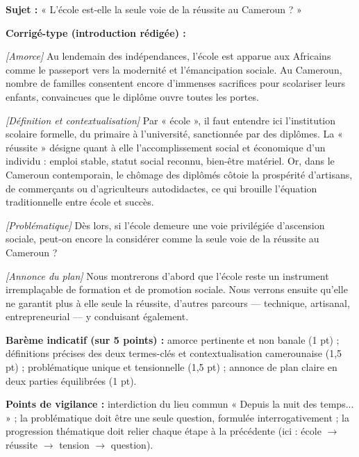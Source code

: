 \documentclass[11pt]{article}
\begin{document}
\begin{corrige}
\textbf{Sujet :} « L'école est-elle la seule voie de la réussite au Cameroun ? »

\textbf{Corrigé-type (introduction rédigée) :}

\emph{[Amorce]} Au lendemain des indépendances, l'école est apparue aux Africains comme le passeport vers la modernité et l'émancipation sociale. Au Cameroun, nombre de familles consentent encore d'immenses sacrifices pour scolariser leurs enfants, convaincues que le diplôme ouvre toutes les portes.

\emph{[Définition et contextualisation]} Par « école », il faut entendre ici l'institution scolaire formelle, du primaire à l'université, sanctionnée par des diplômes. La « réussite » désigne quant à elle l'accomplissement social et économique d'un individu : emploi stable, statut social reconnu, bien-être matériel. Or, dans le Cameroun contemporain, le chômage des diplômés côtoie la prospérité d'artisans, de commerçants ou d'agriculteurs autodidactes, ce qui brouille l'équation traditionnelle entre école et succès.

\emph{[Problématique]} Dès lors, si l'école demeure une voie privilégiée d'ascension sociale, peut-on encore la considérer comme la seule voie de la réussite au Cameroun ?

\emph{[Annonce du plan]} Nous montrerons d'abord que l'école reste un instrument irremplaçable de formation et de promotion sociale. Nous verrons ensuite qu'elle ne garantit plus à elle seule la réussite, d'autres parcours — technique, artisanal, entrepreneurial — y conduisant également.

\textbf{Barème indicatif (sur 5 points) :} amorce pertinente et non banale (1 pt) ; définitions précises des deux termes-clés et contextualisation camerounaise (1,5 pt) ; problématique unique et tensionnelle (1,5 pt) ; annonce de plan claire en deux parties équilibrées (1 pt).

\textbf{Points de vigilance :} interdiction du lieu commun « Depuis la nuit des temps... » ; la problématique doit être une seule question, formulée interrogativement ; la progression thématique doit relier chaque étape à la précédente (ici : école $\to$ réussite $\to$ tension $\to$ question).
\end{corrige}
\end{document}
